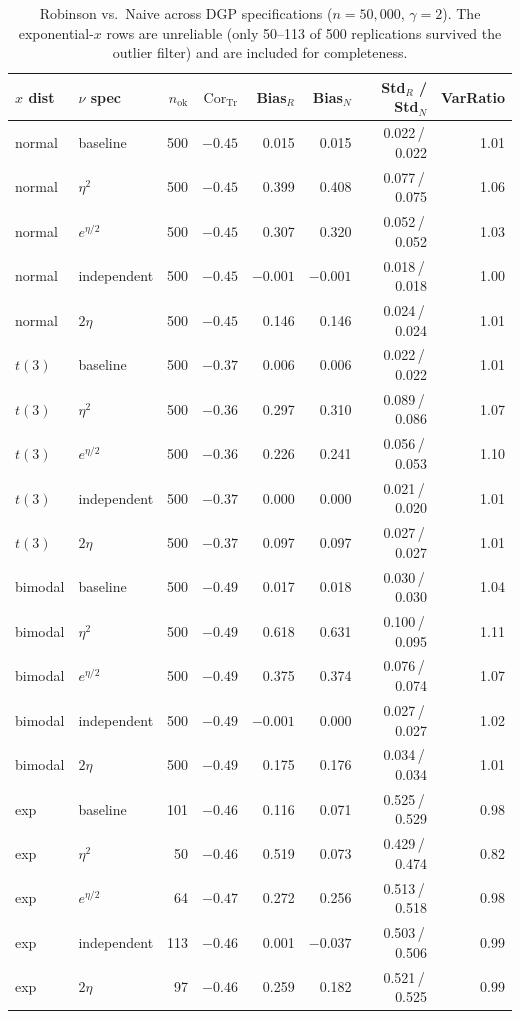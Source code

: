 \begin{table}[h]
\centering
\caption{Robinson vs.\ Naive across DGP specifications ($n = 50{,}000$, $\gamma = 2$). The exponential-$x$ rows are unreliable (only 50--113 of 500 replications survived the outlier filter) and are included for completeness.}
\label{tab:dgp_sweep}
\small
\begin{tabular}{ll r r r r r r}
\toprule
$x$ dist & $\nu$ spec & $n_{\mathrm{ok}}$ & $\mathrm{Cor}_{\mathrm{Tr}}$ & Bias$_R$ & Bias$_N$ & Std$_R$ / Std$_N$ & VarRatio \\
\midrule
normal  & baseline     & 500 & $-0.45$ & 0.015 & 0.015 & 0.022\,/\,0.022 & 1.01 \\
normal  & $\eta^2$     & 500 & $-0.45$ & 0.399 & 0.408 & 0.077\,/\,0.075 & 1.06 \\
normal  & $e^{\eta/2}$ & 500 & $-0.45$ & 0.307 & 0.320 & 0.052\,/\,0.052 & 1.03 \\
normal  & independent  & 500 & $-0.45$ & $-0.001$ & $-0.001$ & 0.018\,/\,0.018 & 1.00 \\
normal  & $2\eta$      & 500 & $-0.45$ & 0.146 & 0.146 & 0.024\,/\,0.024 & 1.01 \\
\addlinespace
$t(3)$  & baseline     & 500 & $-0.37$ & 0.006 & 0.006 & 0.022\,/\,0.022 & 1.01 \\
$t(3)$  & $\eta^2$     & 500 & $-0.36$ & 0.297 & 0.310 & 0.089\,/\,0.086 & 1.07 \\
$t(3)$  & $e^{\eta/2}$ & 500 & $-0.36$ & 0.226 & 0.241 & 0.056\,/\,0.053 & 1.10 \\
$t(3)$  & independent  & 500 & $-0.37$ & 0.000 & 0.000 & 0.021\,/\,0.020 & 1.01 \\
$t(3)$  & $2\eta$      & 500 & $-0.37$ & 0.097 & 0.097 & 0.027\,/\,0.027 & 1.01 \\
\addlinespace
bimodal & baseline     & 500 & $-0.49$ & 0.017 & 0.018 & 0.030\,/\,0.030 & 1.04 \\
bimodal & $\eta^2$     & 500 & $-0.49$ & 0.618 & 0.631 & 0.100\,/\,0.095 & 1.11 \\
bimodal & $e^{\eta/2}$ & 500 & $-0.49$ & 0.375 & 0.374 & 0.076\,/\,0.074 & 1.07 \\
bimodal & independent  & 500 & $-0.49$ & $-0.001$ & 0.000 & 0.027\,/\,0.027 & 1.02 \\
bimodal & $2\eta$      & 500 & $-0.49$ & 0.175 & 0.176 & 0.034\,/\,0.034 & 1.01 \\
\addlinespace
exp     & baseline     & 101 & $-0.46$ & 0.116 & 0.071 & 0.525\,/\,0.529 & 0.98 \\
exp     & $\eta^2$     &  50 & $-0.46$ & 0.519 & 0.073 & 0.429\,/\,0.474 & 0.82 \\
exp     & $e^{\eta/2}$ &  64 & $-0.47$ & 0.272 & 0.256 & 0.513\,/\,0.518 & 0.98 \\
exp     & independent  & 113 & $-0.46$ & 0.001 & $-0.037$ & 0.503\,/\,0.506 & 0.99 \\
exp     & $2\eta$      &  97 & $-0.46$ & 0.259 & 0.182 & 0.521\,/\,0.525 & 0.99 \\
\bottomrule
\end{tabular}
\end{table}

